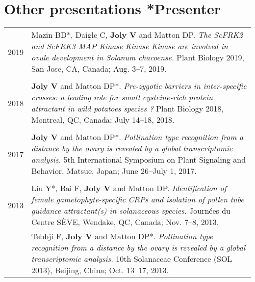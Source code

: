 \documentclass[letterpaper,12pt]{article}
\begin{document}
\vspace{6mm}

\section[Other presentations]{Other presentations \hfill \small{*Presenter}}

\begin{tabularx}{\textwidth}{@{}r|X@{}}

2019
& Mazin BD*, Daigle C, \textbf{Joly V} and Matton DP.
  \emph{The ScFRK2 and ScFRK3 MAP Kinase Kinase Kinase are involved in ovule
  development in \emph{Solanum chacoense}.}
  Plant Biology 2019, San Jose, CA, Canada;
  Aug. 3--7, 2019.
  \\

\multicolumn{2}{c}{} \\


2018
& \textbf{Joly V} and Matton DP*.
  \emph{Pre-zygotic barriers in inter-specific crosses: a leading role for small
  cysteine-rich protein attractant in wild potatoes species ?}
  Plant Biology 2018, Montreal, QC, Canada;
  July 14–18, 2018.
  \\

\multicolumn{2}{c}{} \\

2017
& \textbf{Joly V} and Matton DP*.
  \emph{Pollination type recognition from a distance by the ovary is revealed
  by a global transcriptomic analysis.}
  5th International Symposium on Plant Signaling and Behavior, Matsue, Japan;
  June 26–July 1, 2017.
  \\

\multicolumn{2}{c}{} \\

2013
& Liu Y*, Bai F, \textbf{Joly V} and Matton DP.
  \emph{Identification of female gametophyte-specific CRPs and isolation of
  pollen tube guidance attractant(s) in solanaceous species.}
  Journées du Centre SÈVE, Wendake, QC, Canada;
  Nov. 7–8, 2013.
  \vspace{1.5mm}
  \\

& Tebbji F, \textbf{Joly V} and Matton DP*. \emph{Pollination type recognition
  from a distance by the ovary is revealed by a global transcriptomic analysis.}
  10th Solanaceae Conference (SOL 2013), Beijing, China;
  Oct. 13–17, 2013.
  \vspace{1.5mm}
  \\


\end{tabularx}
\end{document}
